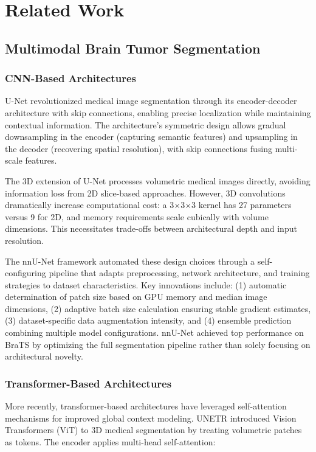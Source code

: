 \documentclass[conference]{IEEEtran}
\begin{document}
\section{Related Work}

\subsection{Multimodal Brain Tumor Segmentation}

\subsubsection{CNN-Based Architectures}

U-Net \cite{ronneberger2015unet} revolutionized medical image segmentation through its encoder-decoder architecture with skip connections, enabling precise localization while maintaining contextual information. The architecture's symmetric design allows gradual downsampling in the encoder (capturing semantic features) and upsampling in the decoder (recovering spatial resolution), with skip connections fusing multi-scale features.

The 3D extension of U-Net processes volumetric medical images directly, avoiding information loss from 2D slice-based approaches. However, 3D convolutions dramatically increase computational cost: a 3×3×3 kernel has 27 parameters versus 9 for 2D, and memory requirements scale cubically with volume dimensions. This necessitates trade-offs between architectural depth and input resolution.

The nnU-Net framework \cite{isensee2021nnu} automated these design choices through a self-configuring pipeline that adapts preprocessing, network architecture, and training strategies to dataset characteristics. Key innovations include: (1) automatic determination of patch size based on GPU memory and median image dimensions, (2) adaptive batch size calculation ensuring stable gradient estimates, (3) dataset-specific data augmentation intensity, and (4) ensemble prediction combining multiple model configurations. nnU-Net achieved top performance on BraTS by optimizing the full segmentation pipeline rather than solely focusing on architectural novelty.

\subsubsection{Transformer-Based Architectures}

More recently, transformer-based architectures have leveraged self-attention mechanisms for improved global context modeling. UNETR \cite{hatamizadeh2022unetr} introduced Vision Transformers (ViT) to 3D medical segmentation by treating volumetric patches as tokens. The encoder applies multi-head self-attention:
\end{document}
